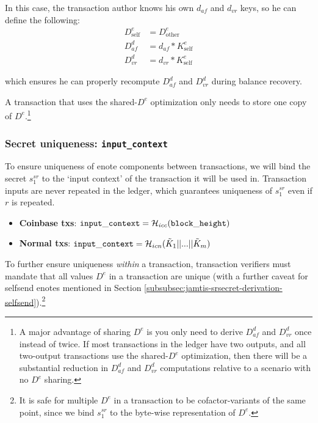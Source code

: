 In this case, the transaction author knows his own $d_{af}$ and $d_{vr}$ keys, so he can define the following:\vspace{.115cm}
\begin{align*}
    D^e_{\textrm{self}} &= D^e_{\textrm{other}} \\
    D^d_{af}            &= d_{af} * K^e_{\textrm{self}} \\
    D^d_{vr}            &= d_{vr} * K^e_{\textrm{self}}
\end{align*}

which ensures he can properly recompute $D^d_{af}$ and $D^d_{vr}$ during balance recovery.

A transaction that uses the shared-$D^e$ optimization only needs to store one copy of $D^e$.\footnote{A major advantage of sharing $D^e$ is you only need to derive $D^d_{af}$ and $D^d_{vr}$ once instead of twice. If most transactions in the ledger have two outputs, and all two-output transactions use the shared-$D^e$ optimization, then there will be a substantial reduction in $D^d_{af}$ and $D^d_{vr}$ computations relative to a scenario with no $D^e$ sharing.}

\subsubsection{Secret uniqueness: {\tt input\_context}}
\label{subsubsec:jamtis-srsecret-secret-uniqueness}

To ensure uniqueness of enote components between transactions, we will bind the secret $s^{sr}_1$ to the `input context' of the transaction it will be used in. Transaction inputs are never repeated in the ledger, which guarantees uniqueness of $s^{sr}_1$ even if $r$ is repeated.

\begin{itemize}
    \item \textbf{Coinbase txs}: ${\tt input\_context} = \mathcal{H}_{icc}({\tt block\_height})$
    \item \textbf{Normal txs}: ${\tt input\_context} = \mathcal{H}_{icn}(\tilde{K}_1 || ... || \tilde{K}_m)$
\end{itemize}

To further ensure uniqueness {\em within} a transaction, transaction verifiers must mandate that all values $D^e$ in a transaction are unique (with a further caveat for selfsend enotes mentioned in Section \ref{subsubsec:jamtis-srsecret-derivation-selfsend}).\footnote{It is safe for multiple $D^e$ in a transaction to be cofactor-variants of the same point, since we bind $s^{sr}_1$ to the byte-wise representation of $D^e$.}

